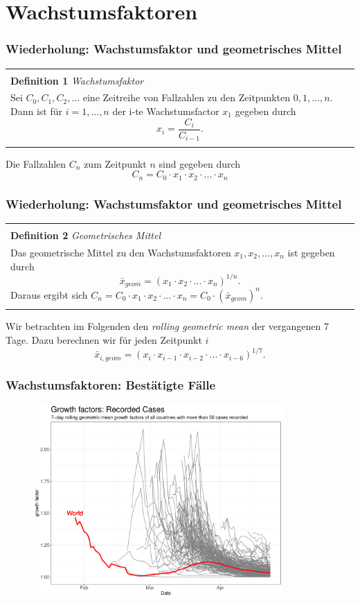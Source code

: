 \documentclass{beamer}
\newenvironment{boxeded}
    {\begin{center}
    \begin{tabular}{|p{0.9\textwidth}|}
    \hline\\
    }
    { 
    \\\\\hline
    \end{tabular} 
    \end{center}
    }
\begin{document}
\section{Wachstumsfaktoren}
\begin{frame}
	\frametitle{Wiederholung: Wachstumsfaktor und geometrisches Mittel}
	\begin{boxeded}
		\textbf{Definition 1} \textit{Wachstumsfaktor}\\
		Sei $C_0, C_1, C_2, ...$ eine Zeitreihe von Fallzahlen zu den Zeitpunkten $0, 1, ..., n$. Dann ist für $i = 1, ..., n$ der i-te Wachstumsfactor $x_1$ gegeben durch $$ x_i = \frac{C_i}{C_{i-1}}.$$
	\end{boxeded}

	Die Fallzahlen $C_n$ zum Zeitpunkt $n$ sind gegeben durch $$C_n = C_0 \cdot x_1 \cdot x_2 \cdot ... \cdot x_n$$
\end{frame}

\begin{frame}
	\frametitle{Wiederholung: Wachstumsfaktor und geometrisches Mittel}
	\begin{boxeded}
		\textbf{Definition 2} \textit{Geometrisches Mittel}\\
		Das geometrische Mittel zu den Wachstumsfaktoren $x_1, x_2, ..., x_n$ ist gegeben durch $$\bar{x}_{geom} = (x_1 \cdot x_2 \cdot ... \cdot x_n)^{1/n}.$$ Daraus ergibt sich $C_n = C_0 \cdot x_1 \cdot x_2 \cdot ... \cdot x_n = C_0 \cdot (\bar{x}_{geom})^n$.
	\end{boxeded}
	\pause
	Wir betrachten im Folgenden den \emph{rolling geometric mean} der vergangenen 7 Tage. Dazu berechnen wir für jeden Zeitpunkt $i$ $$\bar{x}_{i, geom} = (x_i \cdot x_{i-1} \cdot x_{i-2} \cdot ... \cdot x_{i-6})^{1/7}.$$
\end{frame}

\begin{frame}
	\frametitle{Wachstumsfaktoren: Bestätigte Fälle}
	\begin{figure}
		\centering
		\includegraphics[width = 270pt]{GF_confirmed}
	\end{figure}
\end{frame}
\end{document}
